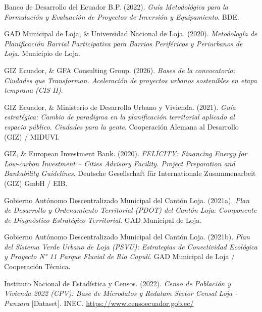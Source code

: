 \documentclass[
  spanish,
  letterpaper,
  DIV=11,
  numbers=noendperiod]{scrartcl}
\newlength{\cslhangindent}
\newenvironment{CSLReferences}[2] %
 {\begin{list}{}{%
  \setlength{\itemindent}{0pt}
  \setlength{\leftmargin}{0pt}
  \setlength{\parsep}{0pt}
  \ifodd #1
   \setlength{\leftmargin}{\cslhangindent}
   \setlength{\itemindent}{-1\cslhangindent}
  \fi
  \setlength{\itemsep}{#2\baselineskip}}}
 {\end{list}}
\begin{document}
\protect{}\label{refs}
\begin{CSLReferences}{1}{0}
Banco de Desarrollo del Ecuador B.P. (2022). \emph{Guía Metodológica
para la Formulación y Evaluación de Proyectos de Inversión y
Equipamiento}. BDE.

GAD Municipal de Loja, \& Universidad Nacional de Loja. (2020).
\emph{Metodología de Planificación Barrial Participativa para Barrios
Periféricos y Periurbanos de Loja}. Municipio de Loja.

GIZ Ecuador, \& GFA Consulting Group. (2026). \emph{Bases de la
convocatoria: Ciudades que Transforman. Aceleración de proyectos urbanos
sostenibles en etapa temprana (CIS II)}.

GIZ Ecuador, \& Ministerio de Desarrollo Urbano y Vivienda. (2021).
\emph{Guía estratégica: Cambio de paradigma en la planificación
territorial aplicado al espacio público. Ciudades para la gente}.
Cooperación Alemana al Desarrollo (GIZ) / MIDUVI.

GIZ, \& European Investment Bank. (2020). \emph{FELICITY: Financing
Energy for Low-carbon Investment -- Cities Advisory Facility. Project
Preparation and Bankability Guidelines}. Deutsche Gesellschaft für
Internationale Zusammenarbeit (GIZ) GmbH / EIB.

Gobierno Autónomo Descentralizado Municipal del Cantón Loja. (2021a).
\emph{Plan de Desarrollo y Ordenamiento Territorial (PDOT) del Cantón
Loja: Componente de Diagnóstico Estratégico Territorial}. GAD Municipal
de Loja.

Gobierno Autónomo Descentralizado Municipal del Cantón Loja. (2021b).
\emph{Plan del Sistema Verde Urbano de Loja (PSVU): Estrategias de
Conectividad Ecológica y Proyecto N° 11 Parque Fluvial de Río Capulí}.
GAD Municipal de Loja / Cooperación Técnica.

Instituto Nacional de Estadística y Censos. (2022). \emph{Censo de
Población y Vivienda 2022 (CPV): Base de Microdatos y Redatam Sector
Censal Loja - Punzara} {[}Dataset{]}. INEC.
\url{https://www.censoecuador.gob.ec/}


\end{CSLReferences}
\end{document}
